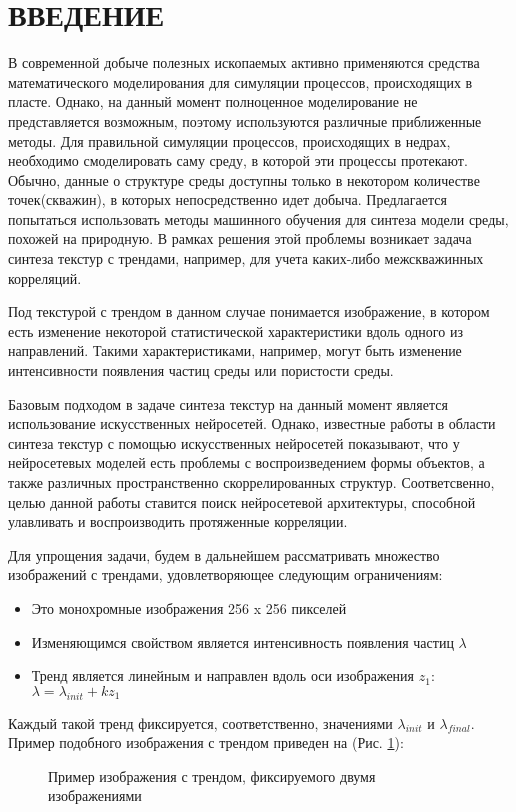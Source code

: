 \newpage
\section*{\hfil ВВЕДЕНИЕ \hfil}
	В современной добыче полезных ископаемых активно применяются средства математического моделирования для симуляции процессов, происходящих в пласте. Однако, на данный момент полноценное моделирование не представляется возможным, поэтому используются различные приближенные методы. Для правильной симуляции процессов, происходящих в недрах, необходимо смоделировать саму среду, в которой эти процессы протекают. Обычно, данные о структуре среды доступны только в некотором количестве точек(скважин), в которых непосредственно идет добыча. Предлагается попытаться использовать методы машинного обучения для синтеза модели среды, похожей на природную. В рамках решения этой проблемы возникает задача синтеза текстур с трендами, например, для учета каких-либо межскважинных корреляций. 
	
	Под текстурой с трендом в данном случае понимается изображение, в котором есть изменение некоторой статистической характеристики вдоль одного из направлений. Такими характеристиками, например, могут быть изменение интенсивности появления частиц среды или пористости среды.
	
	Базовым подходом в задаче синтеза текстур на данный момент является использование искусственных нейросетей. Однако, известные работы в области синтеза текстур с помощью искусственных нейросетей \cite{texture-synthesis-using-CNN, texture-networks} показывают, что у нейросетевых моделей есть проблемы с воспроизведением формы объектов, а также различных пространственно скоррелированных структур. Соответсвенно, целью данной работы ставится поиск нейросетевой архитектуры, способной улавливать и воспроизводить протяженные корреляции.
	
	Для упрощения задачи, будем в дальнейшем рассматривать множество изображений с трендами, удовлетворяющее следующим ограничениям:
	
	\begin{itemize}
		\item Это монохромные изображения 256 x 256 пикселей
		\item Изменяющимся свойством является интенсивность появления частиц $\lambda$
		\item Тренд является линейным и направлен вдоль оси изображения $z_1$: 
		$ \lambda = \lambda_{init} + k z_1 $
	\end{itemize}
	
	Каждый такой тренд фиксируется, соответственно, значениями $\lambda_{init}$ и $\lambda_{final}$. Пример подобного изображения с трендом приведен на (Рис. \ref{1-trend-example}):
	
	\begin{figure}[h]
		\caption{Пример изображения с трендом, фиксируемого двумя изображениями}
		\label{1-trend-example}
	\end{figure}